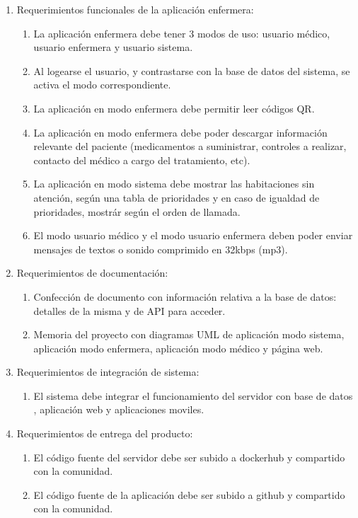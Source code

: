 \documentclass[
11pt, %
]{charter}
\begin{document}
\begin{enumerate}
	
	
	\item Requerimientos funcionales de la aplicación enfermera:
		\begin{enumerate}
			\item La aplicación enfermera debe tener 3 modos de uso: usuario médico, usuario enfermera y usuario sistema.
			\item Al logearse el usuario, y contrastarse con la base de datos del sistema, se activa el modo correspondiente.
			\item La aplicación en modo enfermera debe permitir leer códigos QR.			
			\item La aplicación en modo enfermera debe poder descargar información relevante del paciente (medicamentos a suministrar, controles a realizar, contacto del médico a cargo del tratamiento, etc).	
			\item La aplicación en modo sistema debe mostrar las habitaciones sin atención, según una tabla de prioridades y en caso de igualdad de prioridades, mostrár según el orden de llamada.
			\item El modo usuario médico y el modo usuario enfermera deben poder enviar mensajes de textos o sonido comprimido en 32kbps (mp3).
		\end{enumerate}
		
		
	\item Requerimientos de documentación:
		\begin{enumerate}
			\item Confección de documento con información relativa a la base de datos: detalles de la misma y de API para acceder.
			\item Memoria del proyecto con diagramas UML de aplicación modo sistema, aplicación modo enfermera, aplicación modo médico y página web.
			
		\end{enumerate}
		
		
	\item Requerimientos de integración de sistema:	
			\begin{enumerate}
			\item El sistema debe integrar el funcionamiento del servidor con base de datos , aplicación web y aplicaciones moviles.			
			\end{enumerate}	
			
	\item Requerimientos de entrega del producto:	
			\begin{enumerate}
			\item El código fuente del servidor debe ser subido a dockerhub y compartido con la comunidad.	
			\item El código fuente de la aplicación debe ser subido a github y compartido con la comunidad.
			\end{enumerate}			
	

\end{enumerate}
\end{document}
